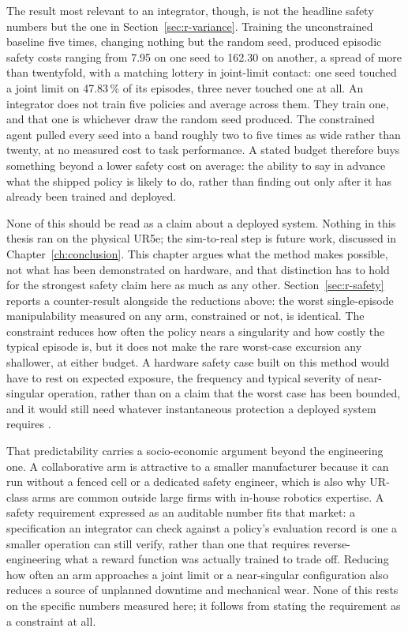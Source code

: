 The result most relevant to an integrator, though, is not the headline safety numbers but the one
in Section~\ref{sec:r-variance}. Training the unconstrained baseline five times, changing nothing
but the random seed, produced episodic safety costs ranging from 7.95 on one seed to 162.30 on
another, a spread of more than twentyfold, with a matching lottery in joint-limit contact: one
seed touched a joint limit on 47.83\,\% of its episodes, three never touched one at all. An
integrator does not train five policies and average across them. They train one, and that one is
whichever draw the random seed produced. The constrained agent pulled every seed into a band
roughly two to five times as wide rather than twenty, at no measured cost to task performance. A
stated budget therefore buys something beyond a lower safety cost on average: the ability to say
in advance what the shipped policy is likely to do, rather than finding out only after it has
already been trained and deployed.

None of this should be read as a claim about a deployed system. Nothing in this thesis ran on the
physical UR5e; the sim-to-real step is future work, discussed in Chapter~\ref{ch:conclusion}. This
chapter argues what the method makes possible, not what has been demonstrated on hardware, and
that distinction has to hold for the strongest safety claim here as much as any other.
Section~\ref{sec:r-safety} reports a counter-result alongside the reductions above: the worst
single-episode manipulability measured on any arm, constrained or not, is identical. The
constraint reduces how often the policy nears a singularity and how costly the typical episode is,
but it does not make the rare worst-case excursion any shallower, at either budget. A hardware
safety case built on this method would have to rest on expected exposure, the frequency and
typical severity of near-singular operation, rather than on a claim that the worst case has been
bounded, and it would still need whatever instantaneous protection a deployed system requires
\cite{brunke2022safe}.

That predictability carries a socio-economic argument beyond the engineering one. A collaborative
arm is attractive to a smaller manufacturer because it can run without a fenced cell or a
dedicated safety engineer, which is also why UR-class arms are common outside large firms with
in-house robotics expertise. A safety requirement expressed as an auditable number fits that
market: a specification an integrator can check against a policy's evaluation record is one a
smaller operation can still verify, rather than one that requires reverse-engineering what a
reward function was actually trained to trade off. Reducing how often an arm approaches a joint
limit or a near-singular configuration also reduces a source of unplanned downtime and mechanical
wear. None of this rests on the specific numbers measured here; it follows from stating the
requirement as a constraint at all.

